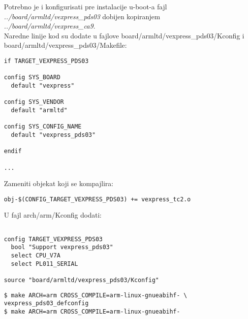 \documentclass{article}
\begin{document}
Potrebno je i konfigurisati pre instalacije u-boot-a fajl \textit{../board/armltd/vexpress\_pds03} dobijen kopiranjem \textit{../board/armltd/vexpress\_ca9}. \\

Naredne linije kod su dodate u fajlove board/armltd/vexpress\_pds03/Kconfig i board/armltd/vexpress\_pds03/Makefile:

\begin{file}
\begin{verbatim}
if TARGET_VEXPRESS_PDS03

config SYS_BOARD
  default "vexpress"

config SYS_VENDOR
  default "armltd"

config SYS_CONFIG_NAME
  default "vexpress_pds03"

endif

...
\end{verbatim}
\end{file}

Zameniti objekat koji se kompajlira:

\begin{file}
\begin{verbatim}
obj-$(CONFIG_TARGET_VEXPRESS_PDS03) += vexpress_tc2.o

\end{verbatim}
\end{file}


U fajl arch/arm/Kconfig dodati:

\begin{file}
\begin{verbatim}

config TARGET_VEXPRESS_PDS03
  bool "Support vexpress_pds03"
  select CPU_V7A
  select PL011_SERIAL

source "board/armltd/vexpress_pds03/Kconfig"

\end{verbatim}
\end{file}

\begin{commandline}
  \begin{verbatim}
$ make ARCH=arm CROSS_COMPILE=arm-linux-gnueabihf- \
vexpress_pds03_defconfig
$ make ARCH=arm CROSS_COMPILE=arm-linux-gnueabihf-
  \end{verbatim}
\end{commandline}

\end{document}

